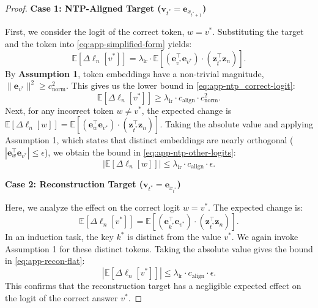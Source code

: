 \begin{proof}
\vspace{1em}
\textbf{Case 1: NTP-Aligned Target ($\mathbf{v}_{t^*} = \mathbf{e}_{x_{t^*+1}}$)}
\vspace{0.5em}

First, we consider the logit of the correct token, $w = v^*$. Substituting the target and the token into \cref{eq:app-simplified-form} yields:
\begin{equation}
\mathbb{E}\left[\Delta\boldsymbol{\ell}_{n}[v^*]\right] = \lambda_{\text{lr}} \cdot \mathbb{E}\left[(\mathbf{e}_{v^*}^\top \mathbf{e}_{v^*}) \cdot (\mathbf{z}_{t^*}^\top \mathbf{z}_n)\right].
\end{equation}
By \textbf{Assumption 1}, token embeddings have a non-trivial magnitude, $\|\mathbf{e}_{v^*}\|^2 \geq c_{\text{norm}}^2$. This gives us the lower bound in \cref{eq:app-ntp_correct-logit}:
\begin{equation}
\mathbb{E}\left[\Delta\boldsymbol{\ell}_{n}[v^*]\right] \geq \lambda_{\text{lr}} \cdot c_{\text{align}} \cdot c_{\text{norm}}^2.
\end{equation}
Next, for any incorrect token $w \neq v^*$, the expected change is $\mathbb{E}\left[\Delta\boldsymbol{\ell}_{n}[w]\right] = \mathbb{E}\left[(\mathbf{e}_{w}^\top \mathbf{e}_{v^*}) \cdot (\mathbf{z}_{t^*}^\top \mathbf{z}_n)\right]$. Taking the absolute value and applying Assumption 1, which states that distinct embeddings are nearly orthogonal ($|\mathbf{e}_w^\top \mathbf{e}_{v^*}| \leq \epsilon$), we obtain the bound in \cref{eq:app-ntp-other-logits}:
\begin{equation}
\left|\mathbb{E}\left[\Delta\boldsymbol{\ell}_{n}[w]\right]\right| \leq \lambda_{\text{lr}} \cdot c_{\text{align}} \cdot \epsilon.
\end{equation}

\vspace{1em}
\textbf{Case 2: Reconstruction Target ($\mathbf{v}_{t^*} = \mathbf{e}_{x_{t^*}}$)}
\vspace{0.5em}

Here, we analyze the effect on the correct logit $w=v^*$. The expected change is:
\begin{equation}
\mathbb{E}\left[\Delta\boldsymbol{\ell}_{n}[v^*]\right] = \mathbb{E}\left[(\mathbf{e}_{k^*}^\top \mathbf{e}_{v^*}) \cdot (\mathbf{z}_{t^*}^\top \mathbf{z}_n)\right].
\end{equation}
In an induction task, the key $k^*$ is distinct from the value $v^*$. We again invoke Assumption 1 for these distinct tokens. Taking the absolute value gives the bound in \cref{eq:app-recon-flat}:
\begin{equation}
\left|\mathbb{E}\left[\Delta\boldsymbol{\ell}_{n}[v^*]\right]\right| \leq \lambda_{\text{lr}} \cdot c_{\text{align}} \cdot \epsilon.
\end{equation}
This confirms that the reconstruction target has a negligible expected effect on the logit of the correct answer $v^*$.


\end{proof}
